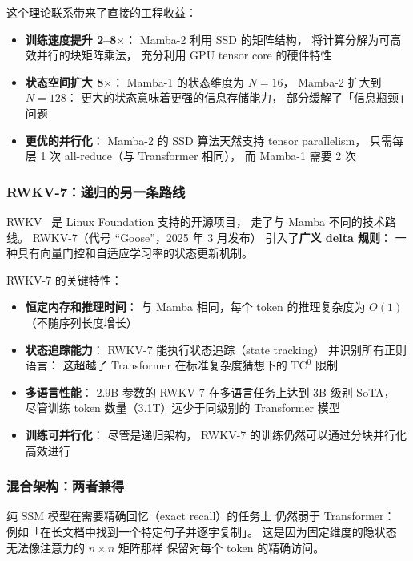 这个理论联系带来了直接的工程收益：
\begin{itemize}[noitemsep]
  \item \textbf{训练速度提升 2--8$\times$}：
        Mamba-2 利用 SSD 的矩阵结构，
        将计算分解为可高效并行的块矩阵乘法，
        充分利用 GPU tensor core 的硬件特性
  \item \textbf{状态空间扩大 8$\times$}：
        Mamba-1 的状态维度为 $N = 16$，
        Mamba-2 扩大到 $N = 128$：
        更大的状态意味着更强的信息存储能力，
        部分缓解了「信息瓶颈」问题
  \item \textbf{更优的并行化}：
        Mamba-2 的 SSD 算法天然支持 tensor parallelism，
        只需每层 1 次 all-reduce（与 Transformer 相同），
        而 Mamba-1 需要 2 次
\end{itemize}

\subsubsection{RWKV-7：递归的另一条路线}

RWKV~\cite{peng2025rwkv7} 是 Linux Foundation 支持的开源项目，
走了与 Mamba 不同的技术路线。
RWKV-7（代号 “Goose”，2025 年 3 月发布）
引入了\textbf{广义 delta 规则}：
一种具有向量门控和自适应学习率的状态更新机制。

RWKV-7 的关键特性：
\begin{itemize}[noitemsep]
  \item \textbf{恒定内存和推理时间}：
        与 Mamba 相同，每个 token 的推理复杂度为 $O(1)$
        （不随序列长度增长）
  \item \textbf{状态追踪能力}：
        RWKV-7 能执行状态追踪（state tracking）
        并识别所有正则语言：
        这超越了 Transformer 在标准复杂度猜想下的 $\mathrm{TC}^0$ 限制
  \item \textbf{多语言性能}：
        2.9B 参数的 RWKV-7 在多语言任务上达到 3B 级别 SoTA，
        尽管训练 token 数量（3.1T）远少于同级别的 Transformer 模型
  \item \textbf{训练可并行化}：
        尽管是递归架构，
        RWKV-7 的训练仍然可以通过分块并行化高效进行
\end{itemize}

\subsubsection{混合架构：两者兼得}

纯 SSM 模型在需要精确回忆（exact recall）的任务上
仍然弱于 Transformer：
例如「在长文档中找到一个特定句子并逐字复制」。
这是因为固定维度的隐状态
无法像注意力的 $n \times n$ 矩阵那样
保留对每个 token 的精确访问。

